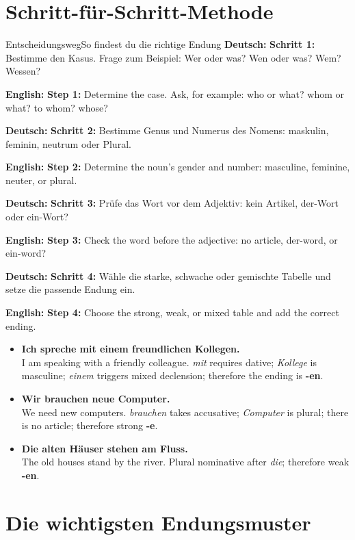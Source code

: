 \documentclass[a4paper,11pt]{article}
\newcommand{\GermanText}[1]{\textbf{Deutsch: }#1\par}
\newcommand{\EnglishText}[1]{{\small\color{SoftGray}\textbf{English: }#1\par}}
\newcommand{\ExampleItem}[2]{\item \textbf{#1}\\{\small\color{SoftGray}#2}}
\begin{document}
    \section{Schritt-für-Schritt-Methode}

        \begin{grammarentry}{Entscheidungsweg}{So findest du die richtige Endung}
            \GermanText{\textbf{Schritt 1:} Bestimme den Kasus. Frage zum Beispiel: Wer oder was? Wen oder was? Wem? Wessen?}
            \EnglishText{\textbf{Step 1:} Determine the case. Ask, for example: who or what? whom or what? to whom? whose?}

            \GermanText{\textbf{Schritt 2:} Bestimme Genus und Numerus des Nomens: maskulin, feminin, neutrum oder Plural.}
            \EnglishText{\textbf{Step 2:} Determine the noun's gender and number: masculine, feminine, neuter, or plural.}

            \GermanText{\textbf{Schritt 3:} Prüfe das Wort vor dem Adjektiv: kein Artikel, der-Wort oder ein-Wort?}
            \EnglishText{\textbf{Step 3:} Check the word before the adjective: no article, der-word, or ein-word?}

            \GermanText{\textbf{Schritt 4:} Wähle die starke, schwache oder gemischte Tabelle und setze die passende Endung ein.}
            \EnglishText{\textbf{Step 4:} Choose the strong, weak, or mixed table and add the correct ending.}
        \end{grammarentry}

        \begin{exbox}
            \begin{itemize}
                \ExampleItem{Ich spreche mit einem freundlich\textbf{en} Kollegen.}{I am speaking with a friendly colleague. \textit{mit} requires dative; \textit{Kollege} is masculine; \textit{einem} triggers mixed declension; therefore the ending is \textbf{-en}.}
                \ExampleItem{Wir brauchen neu\textbf{e} Computer.}{We need new computers. \textit{brauchen} takes accusative; \textit{Computer} is plural; there is no article; therefore strong \textbf{-e}.}
                \ExampleItem{Die alt\textbf{en} Häuser stehen am Fluss.}{The old houses stand by the river. Plural nominative after \textit{die}; therefore weak \textbf{-en}.}
            \end{itemize}
        \end{exbox}

    \section{Die wichtigsten Endungsmuster}
\end{document}
